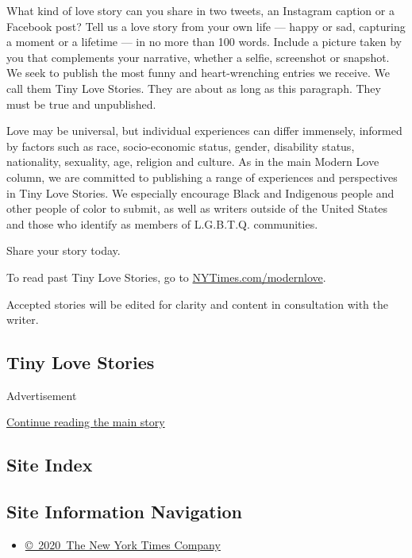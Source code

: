 What kind of love story can you share in two tweets, an Instagram
caption or a Facebook post? Tell us a love story from your own life ---
happy or sad, capturing a moment or a lifetime --- in no more than 100
words. Include a picture taken by you that complements your narrative,
whether a selfie, screenshot or snapshot. We seek to publish the most
funny and heart-wrenching entries we receive. We call them Tiny Love
Stories. They are about as long as this paragraph. They must be true and
unpublished.

Love may be universal, but individual experiences can differ immensely,
informed by factors such as race, socio-economic status, gender,
disability status, nationality, sexuality, age, religion and culture. As
in the main Modern Love column, we are committed to publishing a range
of experiences and perspectives in Tiny Love Stories. We especially
encourage Black and Indigenous people and other people of color to
submit, as well as writers outside of the United States and those who
identify as members of L.G.B.T.Q. communities.

Share your story today.

To read past Tiny Love Stories, go to
\href{https://www.nytimes3xbfgragh.onion/column/modern-love}{NYTimes.com/modernlove}.

Accepted stories will be edited for clarity and content in consultation
with the writer.

\hypertarget{tiny-love-stories}{%
\subsection{Tiny Love Stories}\label{tiny-love-stories}}

Advertisement

\protect\hyperlink{after-bottom}{Continue reading the main story}

\hypertarget{site-index}{%
\subsection{Site Index}\label{site-index}}

\hypertarget{site-information-navigation}{%
\subsection{Site Information
Navigation}\label{site-information-navigation}}

\begin{itemize}
\tightlist
\item
  \href{https://help.nytimes3xbfgragh.onion/hc/en-us/articles/115014792127-Copyright-notice}{©~2020~The
  New York Times Company}
\end{itemize}

